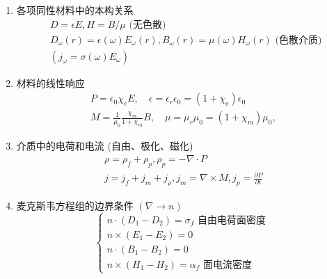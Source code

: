 \documentclass[../../note.tex]{subfiles}
\begin{document}
\begin{enumerate}
\begin{equation}
\begin{array} { l }
	\end{array} \quad \left\{\begin{array}{l}
		\nabla \cdot {D}=\rho_f \\
		\nabla \times {E}=-\frac{\partial}{\partial t} B \\
		\nabla \cdot {B}=0 \\
		\nabla \times {H}={j}_f+\frac{\partial}{\partial t} {D}
	\end{array}\right.\right.
\end{equation}
	\item 各项同性材料中的本构关系
	\begin{align}
		& D=\epsilon {E}, {H}={B} / \mu \text { (无色散) } \\
		& D_\omega(r)=\epsilon(\omega) {E}_\omega(r), B_\omega(r)=\mu(\omega) {H}_\omega(r) \text { (色散介质) } \\
		& \left(j_\omega=\sigma(\omega) {E}_\omega\right)
	\end{align}
	\item 材料的线性响应
	\begin{align}
		{P}=\epsilon_0 \chi_e {E}, \quad \epsilon=\epsilon_r \epsilon_0=\left(1+\chi_e\right) \epsilon_0 \\
		M=\frac{1}{\mu_0} \frac{\chi_m}{1+\chi_m} {B}, \quad \mu=\mu_r \mu_0=\left(1+\chi_m\right) \mu_0,
	\end{align}
	\item 介质中的电荷和电流 (自由、极化、磁化)
\begin{align}
		\rho=\rho_f+\rho_p, \rho_p=-\nabla \cdot {P} \\
		{j}={j}_f+{j}_m+{j}_\rho, {j}_m=\nabla \times {M}, {j}_p=\frac{\partial {P}}{\partial t}
\end{align}
	\item 麦克斯韦方程组的边界条件 $(\nabla \rightarrow n)$
	\begin{equation}
	\left\{\begin{array}{l}
		n \cdot\left(D_1-D_2\right)=\sigma_f \text { 自由电荷面密度 } \\
		n \times\left(E_1-E_2\right)=0 \\
		n \cdot\left(B_1-B_2\right)=0 \\
		n \times\left(H_1-H_2\right)=\alpha_f \text { 面电流密度 }
	\end{array}\right.
\end{equation}
\end{enumerate}
\end{document}
